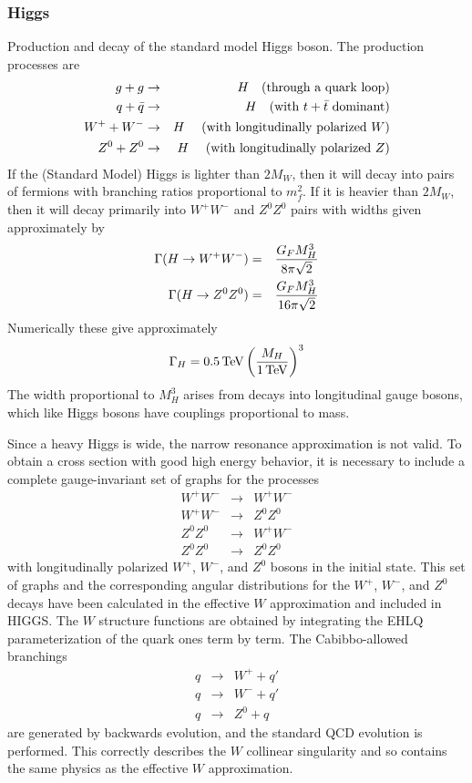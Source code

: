 \subsubsection{Higgs} Production and decay of the standard model Higgs
boson. The production processes are
\begin{eqnarray*}
g + g      &\to& H \quad\hbox{(through a quark loop)} \\
q + \bar q &\to& H \quad\hbox{(with $t + \bar t$ dominant)} \\
W^+ + W^-  &\to& H \quad\hbox{  (with longitudinally polarized $W$)} \\
Z^0 + Z^0  &\to& H \quad\hbox{ (with longitudinally polarized $Z$)}
\end{eqnarray*}
If the (Standard Model) Higgs is lighter than $2 M_W$, then it will
decay into pairs of fermions with branching ratios proportional to
$m_f^2$. If it is heavier than $2 M_W$, then it will decay primarily
into $W^+ W^-$ and $Z^0 Z^0$ pairs with widths given approximately by
\begin{eqnarray*}
\Gamma(H \to W^+ W^-) &=& {G_F M_H^3 \over 8 \pi \sqrt{2} } \\
\Gamma(H \to Z^0 Z^0) &=& {G_F M_H^3 \over 16 \pi \sqrt{2} }
\end{eqnarray*}
Numerically these give approximately
$$
\Gamma_H = 0.5\,{\rm TeV} \left({M_H \over 1\,{\rm TeV}}\right)^3
$$
The width proportional to $M_H^3$ arises from decays into longitudinal
gauge bosons, which like Higgs bosons have couplings proportional to
mass.

      Since a heavy Higgs is wide, the narrow resonance approximation is
not valid. To obtain a cross section with good high energy behavior, it
is necessary to include a complete gauge-invariant set of graphs for the
processes
\begin{eqnarray*}
W^+ W^- &\to& W^+ W^- \\
W^+ W^- &\to& Z^0 Z^0 \\
Z^0 Z^0 &\to& W^+ W^- \\
Z^0 Z^0 &\to& Z^0 Z^0
\end{eqnarray*}
with longitudinally polarized $W^+$, $W^-$, and $Z^0$ bosons in the
initial state. This set of graphs and the corresponding angular
distributions for the $W^+$, $W^-$, and $Z^0$ decays have been
calculated in the effective $W$ approximation and included in HIGGS.
The $W$ structure functions are obtained by integrating the EHLQ
parameterization of the quark ones term by term. The Cabibbo-allowed
branchings
\begin{eqnarray*}
q &\to& W^+ + q' \\
q &\to& W^- + q' \\
q &\to& Z^0 + q
\end{eqnarray*}
are generated by backwards evolution, and the standard QCD evolution is
performed. This correctly describes the $W$ collinear singularity and
so contains the same physics as the effective $W$ approximation.

